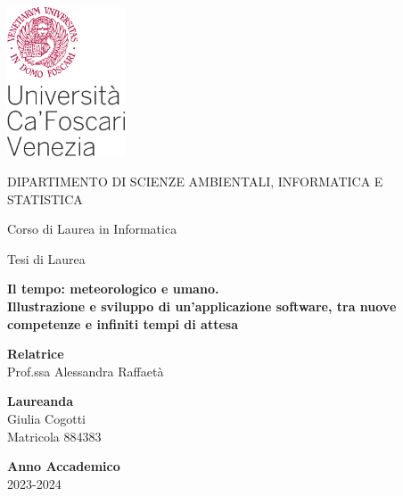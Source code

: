 \begin{titlepage}
	
	\includegraphics[width=3.5cm]{images/unive_logo.pdf}
	
	\begin{center}
		
		\vspace*{1cm}
		
		{\Large DIPARTIMENTO DI SCIENZE AMBIENTALI, INFORMATICA E STATISTICA %
			
			\vspace*{0.5cm}
			
			Corso di Laurea in Informatica}
		
		\vspace*{0.75cm}
		
		{\Large Tesi di Laurea}
		
		\vspace*{0.75cm}
		
	
		{\LARGE\bfseries Il tempo: meteorologico e umano.\\
        \vspace*{0.25cm}
        \Large{Illustrazione e sviluppo di un'applicazione software, tra nuove competenze e infiniti tempi di attesa}} 
		
	\end{center}

	\vfill 


	\noindent\textbf{Relatrice}\\
	Prof.ssa Alessandra Raffaetà
	
	\vspace*{0.25cm}
	
	\noindent\textbf{Laureanda}\\
	Giulia Cogotti\\
    Matricola 884383
	\vspace*{0.25cm}
	
	\noindent\textbf{Anno Accademico}\\
	2023-2024
	
\end{titlepage}
